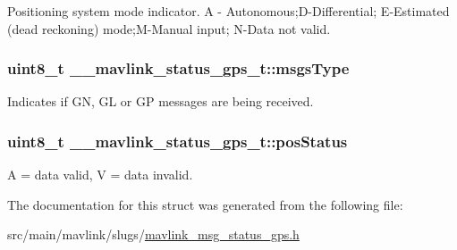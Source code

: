 Positioning system mode indicator. A -\/ Autonomous;D-\/\+Differential; E-\/\+Estimated (dead reckoning) mode;M-\/\+Manual input; N-\/\+Data not valid. 

\hypertarget{struct____mavlink__status__gps__t_a96c027a987f25db1277acc899a396451}{
\subsubsection[{msgs\+Type}]{\setlength{\rightskip}{0pt plus 5cm}uint8\+\_\+t \+\_\+\+\_\+mavlink\+\_\+status\+\_\+gps\+\_\+t\+::msgs\+Type}}\label{struct____mavlink__status__gps__t_a96c027a987f25db1277acc899a396451}


Indicates if G\+N, G\+L or G\+P messages are being received. 

\hypertarget{struct____mavlink__status__gps__t_acae74afd8a08e75f2235006688fe6b47}{
\subsubsection[{pos\+Status}]{\setlength{\rightskip}{0pt plus 5cm}uint8\+\_\+t \+\_\+\+\_\+mavlink\+\_\+status\+\_\+gps\+\_\+t\+::pos\+Status}}\label{struct____mavlink__status__gps__t_acae74afd8a08e75f2235006688fe6b47}


A = data valid, V = data invalid. 



The documentation for this struct was generated from the following file\+:\begin{DoxyCompactItemize}
\item 
src/main/mavlink/slugs/\hyperlink{mavlink__msg__status__gps_8h}{mavlink\+\_\+msg\+\_\+status\+\_\+gps.\+h}\end{DoxyCompactItemize}
